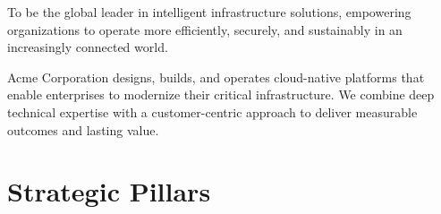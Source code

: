 \documentclass[
    language=english,
    doctype=strategic-plan,
    institution=none,
]{../../omnilatex}
\begin{document}
\maketitle

\begin{tcolorbox}[
    enhanced, colback=blue!5, colframe=blue!75!black, coltitle=white,
    fonttitle=\sffamily\bfseries\large, title={Vision},
    sharp corners, leftrule=4pt, rightrule=0pt, toprule=0pt, bottomrule=0pt,
    boxrule=0.5pt, shadow={1mm}{-1mm}{0mm}{black!30},
]
To be the global leader in intelligent infrastructure solutions, empowering
organizations to operate more efficiently, securely, and sustainably in an
increasingly connected world.
\end{tcolorbox}
\vspace{0.5cm}
\begin{tcolorbox}[
    enhanced, colback=green!5, colframe=green!50!black, coltitle=white,
    fonttitle=\sffamily\bfseries\large, title={Mission},
    sharp corners, leftrule=4pt, rightrule=0pt, toprule=0pt, bottomrule=0pt,
    boxrule=0.5pt, shadow={1mm}{-1mm}{0mm}{black!30},
]
Acme Corporation designs, builds, and operates cloud-native platforms that
enable enterprises to modernize their critical infrastructure. We combine
deep technical expertise with a customer-centric approach to deliver measurable
outcomes and lasting value.
\end{tcolorbox}

\section{Strategic Pillars}
\end{document}
